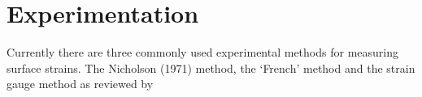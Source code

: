 \section{Experimentation}
Currently there are three commonly used experimental methods for measuring
surface strains. The Nicholson (1971) method, the `French' method and the strain
gauge method as reviewed by \cite{Murphy_2005}